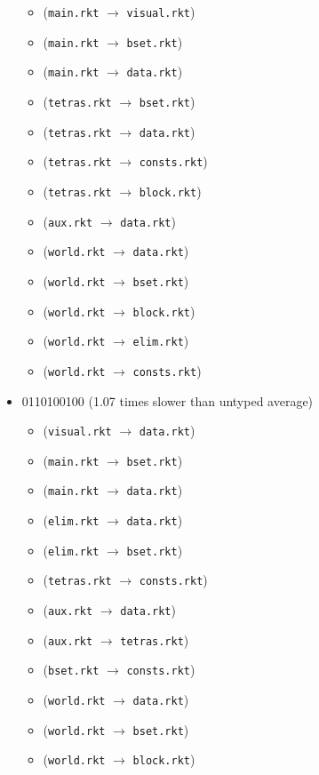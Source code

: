 \documentclass{article}
\newcommand{\mono}[1]{\texttt{#1}}
\begin{document}
\begin{itemize}
\begin{itemize}
  \item (\mono{main.rkt} $\rightarrow$ \mono{visual.rkt})
  \item (\mono{main.rkt} $\rightarrow$ \mono{bset.rkt})
  \item (\mono{main.rkt} $\rightarrow$ \mono{data.rkt})
  \item (\mono{tetras.rkt} $\rightarrow$ \mono{bset.rkt})
  \item (\mono{tetras.rkt} $\rightarrow$ \mono{data.rkt})
  \item (\mono{tetras.rkt} $\rightarrow$ \mono{consts.rkt})
  \item (\mono{tetras.rkt} $\rightarrow$ \mono{block.rkt})
  \item (\mono{aux.rkt} $\rightarrow$ \mono{data.rkt})
  \item (\mono{world.rkt} $\rightarrow$ \mono{data.rkt})
  \item (\mono{world.rkt} $\rightarrow$ \mono{bset.rkt})
  \item (\mono{world.rkt} $\rightarrow$ \mono{block.rkt})
  \item (\mono{world.rkt} $\rightarrow$ \mono{elim.rkt})
  \item (\mono{world.rkt} $\rightarrow$ \mono{consts.rkt})
  \end{itemize}
\item 0110100100 (1.07 times slower than untyped average)
  \begin{itemize}
  \item (\mono{visual.rkt} $\rightarrow$ \mono{data.rkt})
  \item (\mono{main.rkt} $\rightarrow$ \mono{bset.rkt})
  \item (\mono{main.rkt} $\rightarrow$ \mono{data.rkt})
  \item (\mono{elim.rkt} $\rightarrow$ \mono{data.rkt})
  \item (\mono{elim.rkt} $\rightarrow$ \mono{bset.rkt})
  \item (\mono{tetras.rkt} $\rightarrow$ \mono{consts.rkt})
  \item (\mono{aux.rkt} $\rightarrow$ \mono{data.rkt})
  \item (\mono{aux.rkt} $\rightarrow$ \mono{tetras.rkt})
  \item (\mono{bset.rkt} $\rightarrow$ \mono{consts.rkt})
  \item (\mono{world.rkt} $\rightarrow$ \mono{data.rkt})
  \item (\mono{world.rkt} $\rightarrow$ \mono{bset.rkt})
  \item (\mono{world.rkt} $\rightarrow$ \mono{block.rkt})

\end{itemize}
\end{itemize}
\end{document}
